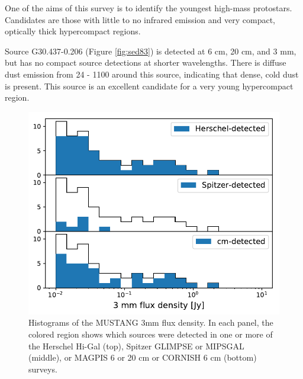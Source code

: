 \documentclass[twocolumn]{aastex62}
\begin{document}
One of the aims of this survey is to identify the youngest high-mass protostars.
Candidates are those with little to no infrared emission and very compact, optically
thick hypercompact \hii regions.

Source G30.437-0.206 (Figure \ref{fig:sed83}) is detected at 6 cm, 20 cm, and 3
mm, but has no compact source detections at shorter wavelengths.  There is
diffuse dust emission from 24 - 1100 \um around this source, indicating that
dense, cold dust is present.  This source is an excellent candidate for a very
young hypercompact \hii region.


\begin{figure}[htp]
    \includegraphics[scale=1]{figures/G31_dend_contour_thr4_minn20_mind1_detection_histograms.pdf}
\caption{Histograms of the MUSTANG 3mm flux density.  In each panel, the colored region shows which
sources were detected in one or more of the Herschel Hi-Gal (top), Spitzer GLIMPSE or MIPSGAL (middle),
or MAGPIS 6 or 20 cm or CORNISH 6 cm (bottom) surveys.}
\label{fig:histogram}
\end{figure}
\end{document}
